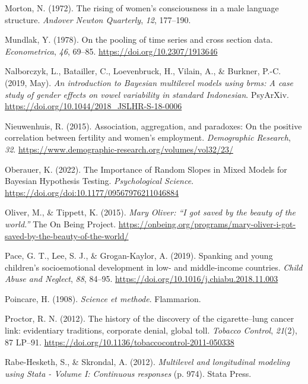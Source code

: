 \documentclass[
  letterpaper,
  DIV=11,
  numbers=noendperiod]{scrreprt}
\newlength{\cslhangindent}
\newenvironment{CSLReferences}[2] %
 {\begin{list}{}{%
  \setlength{\itemindent}{0pt}
  \setlength{\leftmargin}{0pt}
  \setlength{\parsep}{0pt}
  \ifodd #1
   \setlength{\leftmargin}{\cslhangindent}
   \setlength{\itemindent}{-1\cslhangindent}
  \fi
  \setlength{\itemsep}{#2\baselineskip}}}
 {\end{list}}
\begin{document}
\begin{CSLReferences}{1}{0}
Morton, N. (1972). The rising of women's consciousness in a male
language structure. \emph{Andover Newton Quarterly}, \emph{12},
177--190.

Mundlak, Y. (1978). On the pooling of time series and cross section
data. \emph{Econometrica}, \emph{46}, 69--85.
\url{https://doi.org/10.2307/1913646}

Nalborczyk, L., Batailler, C., Loevenbruck, H., Vilain, A., \& Burkner,
P.-C. (2019, May). \emph{An introduction to {B}ayesian multilevel models
using brms: A case study of gender effects on vowel variability in
standard {I}ndonesian}. PsyArXiv.
\url{https://doi.org/10.1044/2018_JSLHR-S-18-0006}

Nieuwenhuis, R. (2015). Association, aggregation, and paradoxes: On the
positive correlation between fertility and women's employment.
\emph{Demographic Research}, \emph{32}.
\url{https://www.demographic-research.org/volumes/vol32/23/}

Oberauer, K. (2022). {The Importance of Random Slopes in Mixed Models
for Bayesian Hypothesis Testing}. \emph{Psychological Science}.
\url{https://doi.org/doi:10.1177/09567976211046884}

Oliver, M., \& Tippett, K. (2015). \emph{{M}ary {O}liver: {``{I} got
saved by the beauty of the world.''}} The On Being Project.
\url{https://onbeing.org/programs/mary-oliver-i-got-saved-by-the-beauty-of-the-world/}

Pace, G. T., Lee, S. J., \& Grogan-Kaylor, A. (2019). {Spanking and
young children's socioemotional development in low- and middle-income
countries}. \emph{Child Abuse and Neglect}, \emph{88}, 84--95.
\url{https://doi.org/10.1016/j.chiabu.2018.11.003}

Poincare, H. (1908). \emph{Science et methode}. Flammarion.

Proctor, R. N. (2012). {The history of the discovery of the
cigarette--lung cancer link: evidentiary traditions, corporate denial,
global toll}. \emph{Tobacco Control}, \emph{21}(2), 87 LP--91.
\url{https://doi.org/10.1136/tobaccocontrol-2011-050338}

Rabe-Hesketh, S., \& Skrondal, A. (2012). \emph{Multilevel and
longitudinal modeling using {S}tata - {V}olume {I}: Continuous
responses} (p. 974). Stata Press.


\end{CSLReferences}
\end{document}
